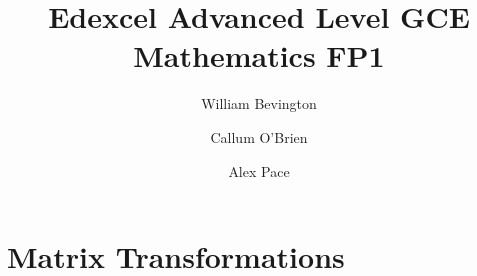 \documentclass{article}
\title{Edexcel Advanced Level GCE Mathematics FP1}
\author{William Bevington \and Callum O'Brien \and Alex Pace}
\date{}
\begin{document}
\maketitle
\tableofcontents
\newpage

\section{Matrix Transformations}
\end{document}
